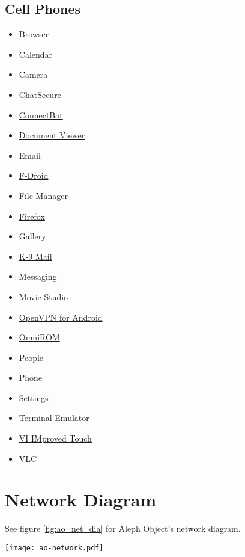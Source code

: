 \subsection{Cell Phones}
\begin{itemize}
\item Browser
\item Calendar
\item Camera
\item \href{https://chatsecure.org/}{ChatSecure}
\item \href{http://code.google.com/p/connectbot/}{ConnectBot}
\item \href{https://github.com/dschuermann/document-viewer}{Document Viewer}
\item Email
\item \href{https://f-droid.org/}{F-Droid}
\item File Manager
\item \href{http://www.mozilla.org/en-US/firefox/}{Firefox}
\item Gallery
\item \href{http://code.google.com/p/k9mail/}{K-9 Mail}
\item Messaging
\item Movie Studio
\item \href{https://code.google.com/p/ics-openvpn/}{OpenVPN for Android}
\item \href{https://omnirom.org/}{OmniROM}
\item People
\item Phone
\item Settings
\item Terminal Emulator
\item \href{https://github.com/momodalo/vimtouch}{VI IMproved Touch}
\item \href{http://www.videolan.org/vlc/download-android.html}{VLC}
\end{itemize}

\section{Network Diagram}
See figure \ref{fig:ao_net_dia} for Aleph Object's network diagram.

\begin{sidewaysfigure}[p]
\texttt{[image: ao-network.pdf]}
 \caption{Network Diagram}
 \label{fig:ao_net_dia}
\end{sidewaysfigure}

